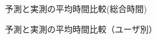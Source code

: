 \begin{figure}[hb]
	\begin{center}
		\caption{予測と実測の平均時間比較(総合時間)}
		\label{fig:compare2}
	\end{center}
\end{figure}

\begin{figure}[hb]
	\begin{center}
		\caption{予測と実測の平均時間比較（ユーザ別）}
		\label{fig:compare3}
	\end{center}
\end{figure}

